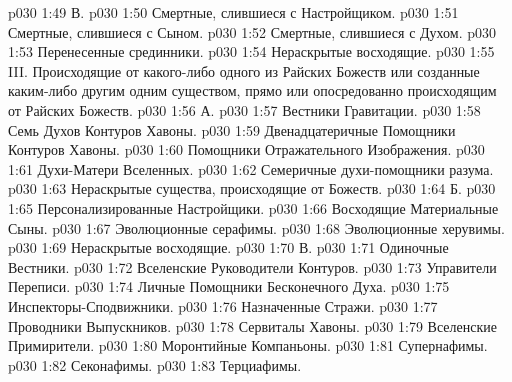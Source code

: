 \vs p030 1:49 \pc В. 
\vs p030 1:50 \bibnobreakspace Смертные, слившиеся с Настройщиком.
\vs p030 1:51 \bibnobreakspace Смертные, слившиеся с Сыном.
\vs p030 1:52 \bibnobreakspace Смертные, слившиеся с Духом.
\vs p030 1:53 \bibnobreakspace Перенесенные срединники.
\vs p030 1:54 \bibnobreakspace Нераскрытые восходящие.
\vs p030 1:55 \pc III.  Происходящие от какого\hyp{}либо одного из Райских Божеств или созданные каким\hyp{}либо другим одним существом, прямо или опосредованно происходящим от Райских Божеств.
\vs p030 1:56 \pc А. 
\vs p030 1:57 \bibnobreakspace Вестники Гравитации.
\vs p030 1:58 \bibnobreakspace Семь Духов Контуров Хавоны.
\vs p030 1:59 \bibnobreakspace Двенадцатеричные Помощники Контуров Хавоны.
\vs p030 1:60 \bibnobreakspace Помощники Отражательного Изображения.
\vs p030 1:61 \bibnobreakspace Духи\hyp{}Матери Вселенных.
\vs p030 1:62 \bibnobreakspace Семеричные духи\hyp{}помощники разума.
\vs p030 1:63 \bibnobreakspace Нераскрытые существа, происходящие от Божеств.
\vs p030 1:64 \pc Б. 
\vs p030 1:65 \bibnobreakspace Персонализированные Настройщики.
\vs p030 1:66 \bibnobreakspace Восходящие Материальные Сыны.
\vs p030 1:67 \bibnobreakspace Эволюционные серафимы.
\vs p030 1:68 \bibnobreakspace Эволюционные херувимы.
\vs p030 1:69 \bibnobreakspace Нераскрытые восходящие.
\vs p030 1:70 \pc В. 
\vs p030 1:71 \bibnobreakspace Одиночные Вестники.
\vs p030 1:72 \bibnobreakspace Вселенские Руководители Контуров.
\vs p030 1:73 \bibnobreakspace Управители Переписи.
\vs p030 1:74 \bibnobreakspace Личные Помощники Бесконечного Духа.
\vs p030 1:75 \bibnobreakspace Инспекторы\hyp{}Сподвижники.
\vs p030 1:76 \bibnobreakspace Назначенные Стражи.
\vs p030 1:77 \bibnobreakspace Проводники Выпускников.
\vs p030 1:78 \bibnobreakspace Сервиталы Хавоны.
\vs p030 1:79 \bibnobreakspace Вселенские Примирители.
\vs p030 1:80 \bibnobreakspace Моронтийные Компаньоны.
\vs p030 1:81 \bibnobreakspace Супернафимы.
\vs p030 1:82 \bibnobreakspace Секонафимы.
\vs p030 1:83 \bibnobreakspace Терциафимы.
